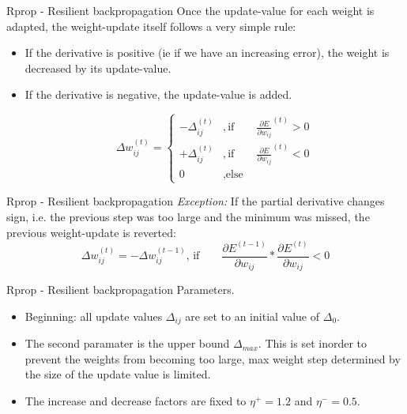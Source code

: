 \documentclass{beamer}
\begin{document}
\begin{frame}{Rprop - Resilient backpropagation}
Once the update-value for each weight is adapted, the weight-update itself follows a very simple rule: 
\begin{itemize}
\item If the derivative is positive (ie if we have an increasing error), the weight is decreased by its update-value. 
\item If the derivative is negative, the update-value is added.


\[
\Delta w_{ij}^{(t)} = \begin{cases}
- \Delta_{ij}^{(t)} & ,  \text{if} \qquad \frac{\partial E}{\partial w_{ij}}^{(t)} > 0 \\

+ \Delta_{ij}^{(t)} & ,  \text{if} \qquad \frac{\partial E}{\partial w_{ij}}^{(t)} < 0 \\

0 & ,  \text{else}

\end{cases}
\]



\end{itemize}

\end{frame}


\begin{frame}{Rprop - Resilient backpropagation}
\textit{Exception:} If the partial derivative changes sign, i.e. the previous step was too large and the minimum was missed, the previous weight-update is reverted: \\

\[ \Delta w_{ij}^{(t)} = - \Delta w_{ij}^{(t-1)} \text{, if} \qquad \frac{\partial E^{(t-1)}}{\partial w_{ij}} * \frac{\partial E^{(t)}}{\partial w_{ij}} < 0 \]



\end{frame}

\begin{frame}{Rprop - Resilient backpropagation}
Parameters.	

\vspace{5mm}

\begin{itemize}

\item Beginning: all update values $ \Delta_{ij} $ are set to an initial value of $ \Delta_0 $. 

\item The second paramater is the upper bound $ \Delta_{max} $. This is set inorder to prevent the weights from becoming too large, max weight step determined by the size of the update value is limited. 
	
\item The increase and decrease factors are fixed to $ \eta^{+} = 1.2 $ and $ \eta^{-} = 0.5 $. 
	
\end{itemize}
	
\end{frame}
\end{document}
